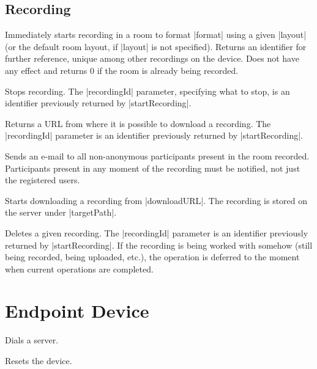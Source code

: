 \subsection{Recording}
\begin{Api}

Immediately starts recording in a room to format |format| using a given |layout| (or the default room layout, if |layout| is not specified). Returns an identifier for further reference, unique among other recordings on the device. Does not have any effect and returns 0 if the room is already being recorded.

Stops recording. The |recordingId| parameter, specifying what to stop, is an identifier previously returned by |startRecording|.

Returns a URL from where it is possible to download a recording. The |recordingId| parameter is an identifier previously returned by |startRecording|.

Sends an e-mail to all non-anonymous participants present in the room recorded. Participants present in any moment of the recording must be notified, not just the registered users.

Starts downloading a recording from |downloadURL|. The recording is stored on the server under |targetPath|.

Deletes a given recording. The |recordingId| parameter is an identifier previously returned by |startRecording|. If the recording is being worked with somehow (still being recorded, being uploaded, etc.), the operation is deferred to the moment when current operations are completed.

\end{Api}


\section{Endpoint Device} \label{sect:connector-endpoint-api}

\begin{Api}

Dials a server.

Resets the device.

\end{Api}


